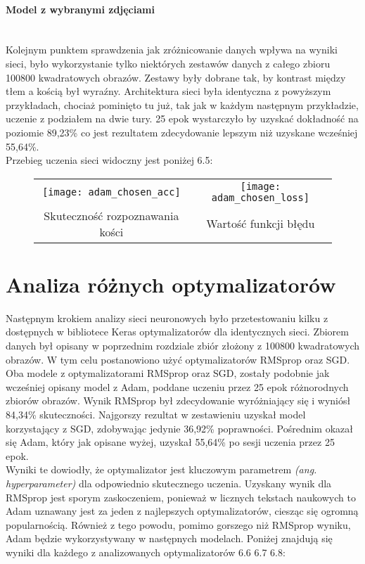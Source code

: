 \paragraph{Model z wybranymi zdjęciami} \mbox{}\\
Kolejnym punktem sprawdzenia jak zróżnicowanie danych wpływa na wyniki sieci, było
wykorzystanie tylko niektórych zestawów danych z całego zbioru 100800 kwadratowych obrazów.
Zestawy były dobrane tak, by kontrast między tłem a kością był wyraźny. Architektura sieci
była identyczna z powyższym przykładach, chociaż pominięto tu już, tak jak w każdym następnym
przykładzie, uczenie z podziałem na dwie tury. 25 epok wystarczyło by uzyskać dokładność
na poziomie 89,23\% co jest rezultatem zdecydowanie lepszym niż uzyskane wcześniej 55,64\%.\\
Przebieg uczenia sieci widoczny jest poniżej 6.5: \newpage

\begin{figure}[h!]
\begin{center}
\begin{tabular}{cc}
\texttt{[image: adam\_chosen\_acc]} &
\texttt{[image: adam\_chosen\_loss]} \\
 Skuteczność rozpoznawania kości & Wartość funkcji błędu\\
\end{tabular}
\label{fig:chosen_plots}
\end{center}
\end{figure}

\section{Analiza różnych optymalizatorów}
Następnym krokiem analizy sieci neuronowych było przetestowaniu kilku z dostępnych
w bibliotece Keras optymalizatorów dla identycznych sieci. Zbiorem danych był
opisany w poprzednim rozdziale zbiór złożony z 100800 kwadratowych obrazów.
W tym celu postanowiono użyć optymalizatorów RMSprop oraz SGD.\\
Oba modele z optymalizatorami RMSprop oraz SGD, zostały podobnie jak wcześniej opisany model
z Adam, poddane uczeniu przez 25 epok różnorodnych zbiorów obrazów. Wynik RMSprop
był zdecydowanie wyróżniający się i wyniósł 84,34\% skuteczności. Najgorszy rezultat w zestawieniu
uzyskał model korzystający z SGD, zdobywając jedynie 36,92\% poprawności. Pośrednim okazał
się Adam, który jak opisane wyżej, uzyskał 55,64\% po sesji uczenia przez 25 epok.\\
Wyniki te dowiodły, że optymalizator jest kluczowym parametrem \textit{(ang. hyperparameter)}
dla odpowiednio skutecznego uczenia. Uzyskany wynik dla RMSprop jest sporym zaskoczeniem,
ponieważ w licznych tekstach naukowych to Adam uznawany jest za jeden z najlepszych
optymalizatorów, ciesząc się ogromną popularnością. Również z tego powodu, pomimo
gorszego niż RMSprop wyniku, Adam będzie wykorzystywany w następnych modelach.
Poniżej znajdują się wyniki dla każdego z analizowanych optymalizatorów 6.6 6.7 6.8:

